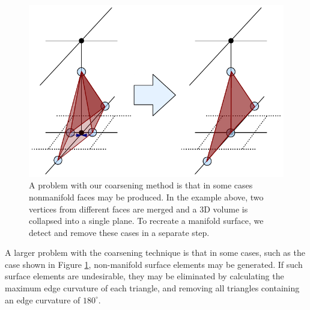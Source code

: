 \documentclass[10pt,journal,cspaper,compsoc]{IEEEtran}
\begin{document}
\begin{figure}[!tb]
\includegraphics[width=\columnwidth]{Nonmanifold.pdf}
\caption{A problem with our coarsening method is that in some cases nonmanifold faces may be produced. In the example above, two vertices from different faces are merged and a 3D volume is collapsed into a single plane. To recreate a manifold surface, we detect and remove these cases in a separate step.}
\label{fig:Nonmanifold}
\end{figure}

A larger problem with the coarsening technique is that in some cases, such as the case shown in Figure \ref{fig:Nonmanifold}, non-manifold surface elements may be generated. If such surface elements are undesirable, they may be eliminated by calculating the maximum edge curvature of each triangle, and removing all triangles containing an edge curvature of $180^{\circ}$.
\end{document}

